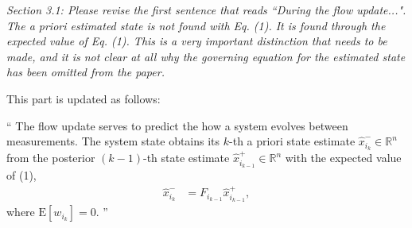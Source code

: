 \documentclass[11pt]{article}
\renewcommand{\Re}{\ensuremath{\mathbb{R}}}
\newenvironment{correction}{\begin{list}{}{\setlength{\leftmargin}{1cm}\setlength{\rightmargin}{1cm}}\vspace{\parsep}\item[]``}{''\end{list}}
\begin{document}
\begin{itemize}
%


\item {\itshape Section 3.1:
Please revise the first sentence that reads ``During the flow update...". The a priori estimated state is not found with Eq. (1).  It is found through the expected value of Eq. (1).  This is a very important distinction that needs to be made, and it is not clear at all why the governing equation for the estimated state has been omitted from the paper.}

This part is updated as follows:
\begin{correction}
The flow update serves to predict the how a system evolves between measurements. The system state obtains its $k$-th a priori state estimate $\hat x_{i_k}^-\in\Re^n$ from the posterior $(k-1)$-th state estimate $\hat x_{i_{k-1}}^+\in\Re^n$ with the expected value of (1),
\begin{align*}
\label{eqn:xestapriori}
\hat x_{i_{k}}^- & = F_{i_{k-1}} \hat x_{i_{k-1}}^+,
\end{align*}
where $\mathrm{E}[w_{i_{k}}]=0$.
\end{correction}

%


\end{itemize}
\end{document}
